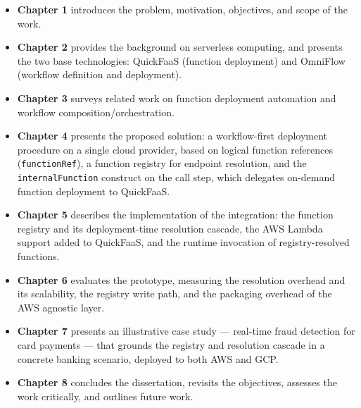 \begin{itemize}
  \item \textbf{Chapter 1} introduces the problem, motivation, objectives, and scope of the work.
  \item \textbf{Chapter 2} provides the background on serverless computing, and presents the two base technologies: QuickFaaS (function deployment) and OmniFlow (workflow definition and deployment).
  \item \textbf{Chapter 3} surveys related work on function deployment automation and workflow composition/orchestration.
  \item \textbf{Chapter 4} presents the proposed solution: a workflow-first deployment procedure on a single cloud provider, based on logical function references (\texttt{functionRef}), a function registry for endpoint resolution, and the \texttt{internalFunction} construct on the call step, which delegates on-demand function deployment to QuickFaaS.
  \item \textbf{Chapter 5} describes the implementation of the integration: the function registry and its deployment-time resolution cascade, the AWS Lambda support added to QuickFaaS, and the runtime invocation of registry-resolved functions.
  \item \textbf{Chapter 6} evaluates the prototype, measuring the resolution overhead and its scalability, the registry write path, and the packaging overhead of the AWS agnostic layer.
  \item \textbf{Chapter 7} presents an illustrative case study --- real-time fraud detection for card payments --- that grounds the registry and resolution cascade in a concrete banking scenario, deployed to both AWS and GCP.
  \item \textbf{Chapter 8} concludes the dissertation, revisits the objectives, assesses the work critically, and outlines future work.
\end{itemize}






























